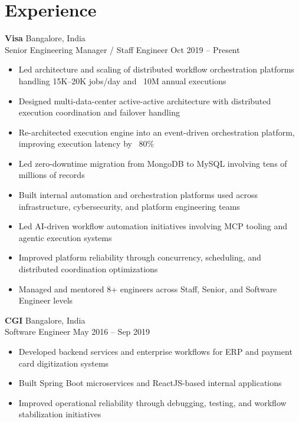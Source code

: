 \section*{Experience}

\textbf{Visa} \hfill Bangalore, India \\
Senior Engineering Manager / Staff Engineer \hfill Oct 2019 -- Present

\begin{itemize}
    \item Led architecture and scaling of distributed workflow orchestration platforms handling 15K--20K jobs/day and ~10M annual executions
    \item Designed multi-data-center active-active architecture with distributed execution coordination and failover handling
    \item Re-architected execution engine into an event-driven orchestration platform, improving execution latency by ~80\%
    \item Led zero-downtime migration from MongoDB to MySQL involving tens of millions of records
    \item Built internal automation and orchestration platforms used across infrastructure, cybersecurity, and platform engineering teams
    \item Led AI-driven workflow automation initiatives involving MCP tooling and agentic execution systems
    \item Improved platform reliability through concurrency, scheduling, and distributed coordination optimizations
    \item Managed and mentored 8+ engineers across Staff, Senior, and Software Engineer levels
\end{itemize}

\vspace{8pt}

\textbf{CGI} \hfill Bangalore, India \\
Software Engineer \hfill May 2016 -- Sep 2019

\begin{itemize}
    \item Developed backend services and enterprise workflows for ERP and payment card digitization systems
    \item Built Spring Boot microservices and ReactJS-based internal applications
    \item Improved operational reliability through debugging, testing, and workflow stabilization initiatives
\end{itemize}
